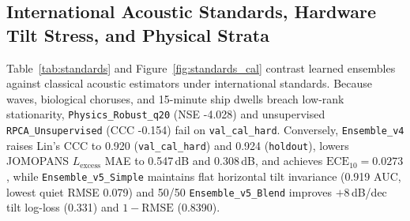 \documentclass[10pt,a4paper]{article}
\begin{document}
\subsection{International Acoustic Standards, Hardware Tilt Stress, and Physical Strata}

Table~\ref{tab:standards} and Figure~\ref{fig:standards_cal} contrast learned ensembles against classical acoustic estimators under international standards. Because waves, biological choruses, and 15-minute ship dwells breach low-rank stationarity, \texttt{Physics\_Robust\_q20} (NSE -4.028) and unsupervised \texttt{RPCA\_Unsupervised} (CCC -0.154) fail on \texttt{val\_cal\_hard}. Conversely, \texttt{Ensemble\_v4} raises Lin's CCC to 0.920 (\texttt{val\_cal\_hard}) and 0.924 (\texttt{holdout}), lowers JOMOPANS $L_{\mathrm{excess}}$ MAE to 0.547\,dB and 0.308\,dB, and achieves $\mathrm{ECE}_{10} = 0.0273$, while \texttt{Ensemble\_v5\_Simple} maintains flat horizontal tilt invariance (0.919 AUC, lowest quiet RMSE 0.079) and 50/50 \texttt{Ensemble\_v5\_Blend} improves $+8$\,dB/dec tilt log-loss (0.331) and $1-\mathrm{RMSE}$ (0.8390).

\begin{table}[!htbp]
\centering
\caption{International acoustic standards evaluation on 100\% calibration-warped \texttt{val\_cal\_hard} ($n=1{,}500$), unseen \texttt{holdout} ($n=541$), and $+8$\,dB/decade tilt stress.}
\label{tab:standards}
\end{table}
\end{document}
